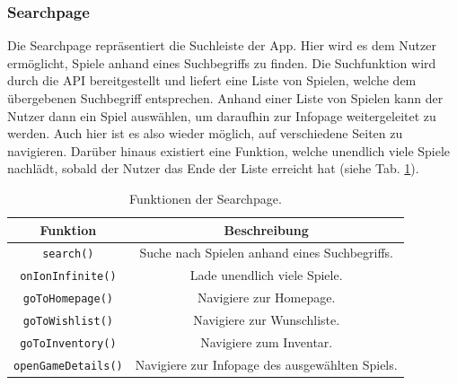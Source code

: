 \subsubsection{Searchpage}
Die Searchpage repräsentiert die Suchleiste der App. Hier wird es dem Nutzer ermöglicht, Spiele anhand eines Suchbegriffs zu finden.
Die Suchfunktion wird durch die \ac{API} bereitgestellt und liefert eine Liste von Spielen, welche dem übergebenen Suchbegriff entsprechen.
Anhand einer Liste von Spielen kann der Nutzer dann ein Spiel auswählen, um daraufhin zur Infopage weitergeleitet zu werden.
Auch hier ist es also wieder möglich, auf verschiedene Seiten zu navigieren.
Darüber hinaus existiert eine Funktion, welche unendlich viele Spiele nachlädt, sobald der Nutzer das Ende der Liste erreicht hat (siehe Tab. \ref{tab:searchpage}).
\begin{table}[H]
    \centering
    \begin{tabular}{|c|c|}
        \hline
        \textbf{Funktion} & \textbf{Beschreibung} \\
        \hline
        \texttt{search()} & Suche nach Spielen anhand eines Suchbegriffs. \\
        \texttt{onIonInfinite()} & Lade unendlich viele Spiele. \\
        \texttt{goToHomepage()} & Navigiere zur Homepage. \\
        \texttt{goToWishlist()} & Navigiere zur Wunschliste. \\
        \texttt{goToInventory()} & Navigiere zum Inventar. \\
        \texttt{openGameDetails()} & Navigiere zur Infopage des ausgewählten Spiels. \\
        \hline
    \end{tabular}
    \caption{Funktionen der Searchpage.}
    \label{tab:searchpage}
\end{table}
